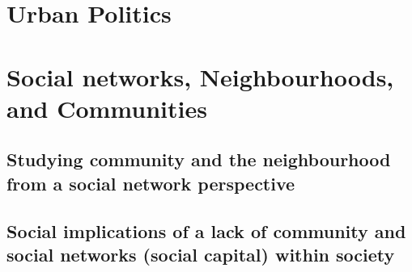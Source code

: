 \documentclass{article}
\begin{document}

\section{Urban Politics}
\date{September 28th, 2021}


\section{Social networks, Neighbourhoods, and Communities}
\date{November 23rd, 2021}

\subsection{Studying community and the neighbourhood from a social network perspective}

\begin{outline}
	\1 
\end{outline}

\subsection{Social implications of a lack of community and social networks (social capital) within society}

\begin{outline}
	\1
\end{outline}

\subsection{}

\begin{outline}
	\1
\end{outline}

\subsection{}

\begin{outline}
	\1
\end{outline}

\end{document}
